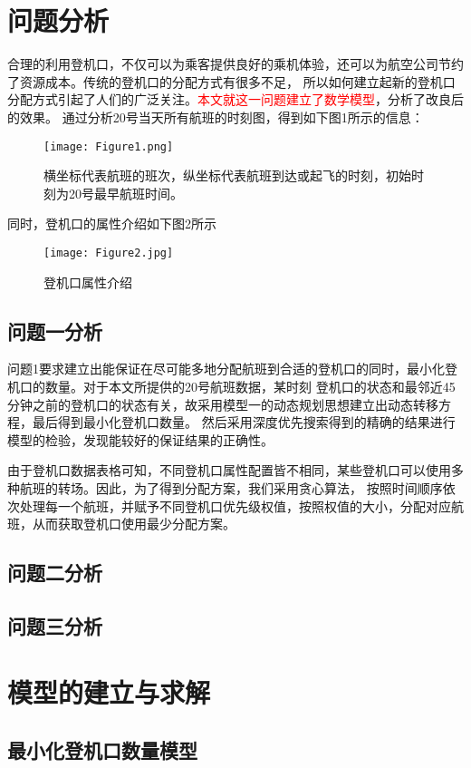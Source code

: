 \documentclass[bwprint]{gmcmthesis}
\begin{document}
\section{问题分析}
合理的利用登机口，不仅可以为乘客提供良好的乘机体验，还可以为航空公司节约了资源成本。传统的登机口的分配方式有很多不足，
所以如何建立起新的登机口分配方式引起了人们的广泛关注。\textcolor{red}{本文就这一问题建立了数学模型}，分析了改良后的效果。
通过分析20号当天所有航班的时刻图，得到如下图1所示的信息：
\begin{figure}[!h]
\centering
\texttt{[image: Figure1.png]}
\caption{
横坐标代表航班的班次，纵坐标代表航班到达或起飞的时刻，初始时刻为20号最早航班时间。}
\end{figure}

同时，登机口的属性介绍如下图2所示
\begin{figure}[!h]
\centering
\texttt{[image: Figure2.jpg]}
\caption{登机口属性介绍}
\end{figure}
\subsection{问题一分析}
问题1要求建立出能保证在尽可能多地分配航班到合适的登机口的同时，最小化登机口的数量。对于本文所提供的20号航班数据，某时刻
登机口的状态和最邻近45分钟之前的登机口的状态有关，故采用模型一的动态规划思想建立出动态转移方程，最后得到最小化登机口数量。
然后采用深度优先搜索得到的精确的结果进行模型的检验，发现能较好的保证结果的正确性。

由于登机口数据表格可知，不同登机口属性配置皆不相同，某些登机口可以使用多种航班的转场。因此，为了得到分配方案，我们采用贪心算法，
按照时间顺序依次处理每一个航班，并赋予不同登机口优先级权值，按照权值的大小，分配对应航班，从而获取登机口使用最少分配方案。


\subsection{问题二分析}

\subsection{问题三分析}

\section{模型的建立与求解}

\subsection{最小化登机口数量模型}
\end{document}
